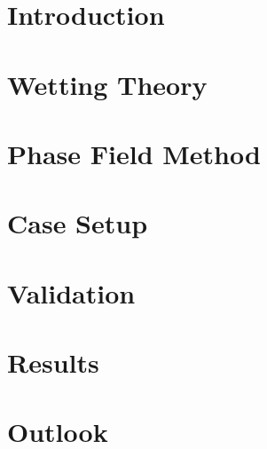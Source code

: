 \documentclass[
	english,
	ruledheaders=section,%
	class=report,%
	thesis={type=master},%
	accentcolor=1c,%
	custommargins=true,%
	marginpar=false,%
	parskip=half-,%
	fontsize=11pt,%
]{tudapub}
\begin{document}
\chapter{Introduction}
\label{chap: Introduction}


%

\chapter{Wetting Theory}
\label{chap: wettingTheory}


\chapter{Phase Field Method}
\label{chap: PhaseFieldMethod}


\chapter{Case Setup}
\label{chap: CaseSetup}


\chapter{Validation}
\label{chap: Validation}


\chapter{Results}
\label{chap: Results}


\chapter{Outlook}
\label{chap: Outlook}


\printbibliography
\end{document}
